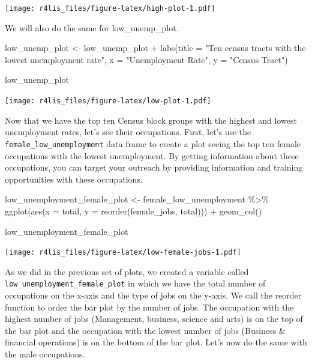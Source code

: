 \documentclass[
  krantz2]{krantz}
\makeatletter
\newenvironment{Shaded}{\begin{snugshade}}{\end{snugshade}}
\newcommand{\AttributeTok}[1]{\textcolor[rgb]{0.61,0.61,0.61}{#1}}
\newcommand{\FunctionTok}[1]{\textcolor[rgb]{0,0,0}{#1}}
\newcommand{\NormalTok}[1]{#1}
\newcommand{\OtherTok}[1]{\textcolor[rgb]{0.37,0.37,0.37}{#1}}
\newcommand{\SpecialCharTok}[1]{\textcolor[rgb]{0,0,0}{#1}}
\newcommand{\StringTok}[1]{\textcolor[rgb]{0.5,0.5,0.5}{#1}}
\newenvironment{kframe}{%
\medskip{}
\setlength{\fboxsep}{.8em}
 \def\at@end@of@kframe{}%
 \ifinner\ifhmode%
  \def\at@end@of@kframe{\end{minipage}}%
  \begin{minipage}{\columnwidth}%
 \fi\fi%
 \def\FrameCommand##1{\hskip\@totalleftmargin \hskip-\fboxsep
 \colorbox{shadecolor}{##1}\hskip-\fboxsep
     \hskip-\linewidth \hskip-\@totalleftmargin \hskip\columnwidth}%
 \MakeFramed {\advance\hsize-\width
   \@totalleftmargin\z@ \linewidth\hsize
   \@setminipage}}%
 {\par\unskip\endMakeFramed%
 \at@end@of@kframe}
\renewenvironment{Shaded}{\begin{kframe}}{\end{kframe}}
\makeatother
\begin{document}
\texttt{[image: r4lis\_files/figure-latex/high-plot-1.pdf]}

We will also do the same for low\_unemp\_plot.

\begin{Shaded}
\begin{Highlighting}[]
\NormalTok{low\_unemp\_plot }\OtherTok{\textless{}{-}}\NormalTok{ low\_unemp\_plot }\SpecialCharTok{+}
  \FunctionTok{labs}\NormalTok{(}\AttributeTok{title =} \StringTok{"Ten census tracts with the lowest unemployment rate"}\NormalTok{, }\AttributeTok{x =} \StringTok{"Unemployment Rate"}\NormalTok{, }\AttributeTok{y =} \StringTok{"Census Tract"}\NormalTok{)}

\NormalTok{low\_unemp\_plot}
\end{Highlighting}
\end{Shaded}

\texttt{[image: r4lis\_files/figure-latex/low-plot-1.pdf]}

Now that we have the top ten Census block groups with the highest and lowest unemployment rates, let's see their occupations. First, let's use the \texttt{female\_low\_unemployment} data frame to create a plot seeing the top ten female occupations with the lowest unemployment. By getting information about these occupations, you can target your outreach by providing information and training opportunities with these occupations.

\begin{Shaded}
\begin{Highlighting}[]
\NormalTok{low\_unemployment\_female\_plot }\OtherTok{\textless{}{-}}\NormalTok{ female\_low\_unemployment }\SpecialCharTok{\%\textgreater{}\%}
  \FunctionTok{ggplot}\NormalTok{(}\FunctionTok{aes}\NormalTok{(}\AttributeTok{x =}\NormalTok{ total, }\AttributeTok{y =} \FunctionTok{reorder}\NormalTok{(female\_jobs, total))) }\SpecialCharTok{+}
  \FunctionTok{geom\_col}\NormalTok{() }

\NormalTok{low\_unemployment\_female\_plot}
\end{Highlighting}
\end{Shaded}

\texttt{[image: r4lis\_files/figure-latex/low-female-jobs-1.pdf]}

As we did in the previous set of plots, we created a variable called \texttt{low\_unemployment\_female\_plot} in which we have the total number of occupations on the x-axis and the type of jobs on the y-axis. We call the reorder function to order the bar plot by the number of jobs. The occupation with the highest number of jobs (Management, business, science and arts) is on the top of the bar plot and the occupation with the lowest number of jobs (Business \& financial operations) is on the bottom of the bar plot. Let's now do the same with the male occupations.
\end{document}
